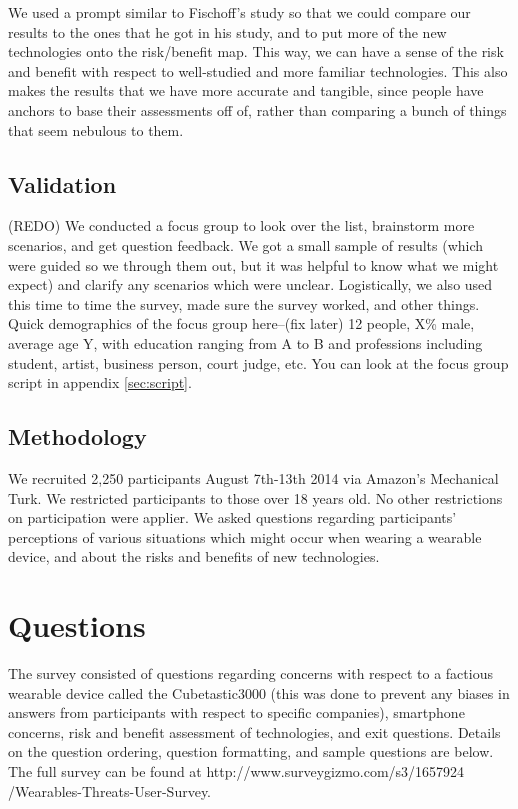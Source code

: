 \documentclass{acm_proc_article-sp}
\begin{document}
We used a prompt similar to Fischoff's study so that we could compare our results to the ones that he got in his study, and to put more of the new technologies onto the risk/benefit map. This way, we can have a sense of the risk and benefit with respect to well-studied and more familiar technologies. This also makes the results that we have more accurate and tangible, since people have anchors to base their assessments off of, rather than comparing a bunch of things that seem nebulous to them.

\subsection{Validation}
(REDO) We conducted a focus group to look over the list, brainstorm more scenarios,  and get question feedback. We got a small sample of results (which were guided so we through them out, but it was helpful to know what we might expect) and clarify any scenarios which were unclear. Logistically, we also used this time to time the survey, made sure the survey worked, and other things. Quick demographics of the focus group here--(fix later) 12 people, X\% male, average age Y, with education ranging from A to B and professions including student, artist, business person, court judge, etc.  You can look at the focus group script in appendix \ref{sec:script}.

\subsection{Methodology}
We recruited 2,250 participants August 7th-13th 2014 via Amazon's Mechanical Turk. We restricted participants to those over 18 years old. No other restrictions on participation were applier. We asked questions regarding participants' perceptions of various situations which might occur when wearing a wearable device, and about the risks and benefits of new technologies.
 
 
\section{Questions}
The survey consisted of questions regarding concerns with respect to a factious wearable device called the Cubetastic3000 (this was done to prevent any biases in answers from participants with respect to specific companies), smartphone concerns, risk and benefit assessment of technologies, and exit questions. Details on the question ordering, question formatting, and sample questions are below. The full survey can be found at http://www.surveygizmo.com/s3/1657924 /Wearables-Threats-User-Survey. 
\end{document}
